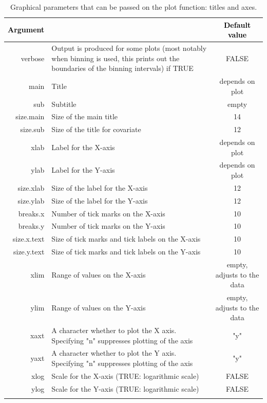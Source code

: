 \documentclass{report}
\begin{document}
\begin{table}[!h] 
\begin{center}
\begin{tabular}{| r p{8cm} c|}
\hline
\textbf{\textcolor{black}{Argument}} & \centering{\textbf{\textcolor{black}{Description }}} & \textbf{\textcolor{black}{Default value}} \\
\hline
{\ttfamily verbose} & Output is produced for some plots (most notably when binning is used, this prints out the boundaries of the binning intervals) if TRUE & FALSE \\
{\ttfamily main} & Title & depends on plot \\
{\ttfamily sub } & Subtitle & empty \\
{\ttfamily size.main } & Size of the main title & 14 \\
{\ttfamily size.sub  } & Size of the title for covariate & 12 \\

{\ttfamily xlab} & Label for the X-axis & depends on plot \\
{\ttfamily ylab} & Label for the Y-axis & depends on plot \\
{\ttfamily size.xlab} & Size of the label for the X-axis & 12 \\
{\ttfamily size.ylab} & Size of the label for the Y-axis & 12 \\
{\ttfamily breaks.x} & Number of tick marks on the X-axis & 10 \\
{\ttfamily breaks.y} & Number of tick marks on the Y-axis & 10 \\
{\ttfamily size.x.text} & Size of tick marks and tick labels on the X-axis & 10 \\
{\ttfamily size.y.text} & Size of tick marks and tick labels on the Y-axis & 10 \\

{\ttfamily xlim} & Range of values on the X-axis & empty, adjusts to the data \\
{\ttfamily ylim} & Range of values on the Y-axis & empty, adjusts to the data \\

{\ttfamily xaxt} & A character whether to plot the X axis. Specifying "n" suppresses plotting of the axis & "y"  \\
{\ttfamily yaxt} & A character whether to plot the Y axis. Specifying "n" suppresses plotting of the axis & "y" \\

{\ttfamily xlog} & Scale for the X-axis (TRUE: logarithmic scale) & FALSE \\
{\ttfamily ylog} & Scale for the Y-axis (TRUE: logarithmic scale) & FALSE \\

{\ttfamily } & &  \\
\hline
\end{tabular} 
\end{center}
\caption{Graphical parameters that can be passed on the plot function: titles and axes.} \label{tab:graphicalOptions1}
\end{table} 
\end{document}
